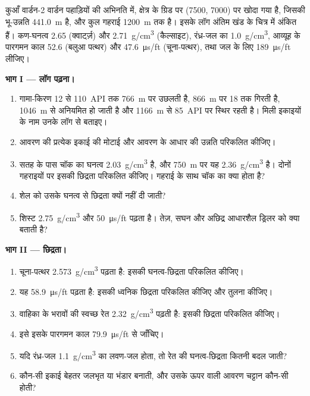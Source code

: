 \begin{problem}[{सप्ताहांत समस्या --- एक काल्पनिक कुएँ के लॉग, छिद्रता, संलक्षणी और शुद्ध रेत,
वार्डन अभिनति में}]
\label{pb:b3:facies-models:1}
कुआँ वार्डन-2 वार्डन पहाड़ियों की अभिनति में, क्षेत्र के ग्रिड पर (7500, 7000) पर
खोदा गया है, जिसकी भू-उन्नति
\qty{441.0}{m} है, और कुल गहराई \qty{1200}{m} तक है। इसके लॉग अंतिम खंड के चित्र में अंकित हैं।
कण-घनत्व 2.65 (क्वार्ट्ज़) और
\qty{2.71}{g/cm^3} (कैल्साइट), रंध्र-जल का \qty{1.0}{g/cm^3}, आव्यूह के
पारगमन काल 52.6 (बलुआ पत्थर) और \qty{47.6}{\micro\second/ft}
(चूना-पत्थर), तथा जल के लिए \qty{189}{\micro\second/ft} लीजिए।

\medskip\noindent\textbf{भाग I --- लॉग पढ़ना।}
\begin{enumerate}
\item गामा-किरण 12 से \qty{110}{API} तक \qty{766}{m} पर उछलती है,
  \qty{866}{m} पर 18 तक गिरती है, \qty{1046}{m} से अनियमित हो जाती है और
  \qty{1166}{m} से \qty{85}{API} पर स्थिर रहती है। मिली इकाइयों के नाम उनके लॉग से बताइए।
\item आवरण की प्रत्येक इकाई की मोटाई और
  आवरण के आधार की उन्नति परिकलित कीजिए।
\item सतह के पास चॉक का घनत्व \qty{2.03}{g/cm^3} है, और
  \qty{750}{m} पर यह \qty{2.36}{g/cm^3} है। दोनों गहराइयों पर इसकी छिद्रता परिकलित कीजिए।
  गहराई के साथ चॉक का क्या होता है?
\item शेल को उसके घनत्व से छिद्रता क्यों नहीं दी जाती?
\item शिस्ट \qty{2.75}{g/cm^3} और \qty{50}{\micro\second/ft} पढ़ता है।
  तेज़, सघन और अछिद्र आधारशैल ड्रिलर को क्या बताती है?
\end{enumerate}

\medskip\noindent\textbf{भाग II --- छिद्रता।}
\begin{enumerate}[resume]
\item चूना-पत्थर \qty{2.573}{g/cm^3} पढ़ता है: इसकी घनत्व-छिद्रता परिकलित कीजिए।
\item यह \qty{58.9}{\micro\second/ft} पढ़ता है: इसकी ध्वनिक छिद्रता परिकलित कीजिए और
  तुलना कीजिए।
\item वाहिका के भरावों की स्वच्छ रेत \qty{2.32}{g/cm^3} पढ़ती है: इसकी
  छिद्रता परिकलित कीजिए।
\item इसे इसके पारगमन काल \qty{79.9}{\micro\second/ft} से जाँचिए।
\item यदि रंध्र-जल \qty{1.1}{g/cm^3} का लवण-जल होता, तो रेत की घनत्व-छिद्रता
  कितनी बदल जाती?
\item कौन-सी इकाई बेहतर जलभृत या भंडार बनाती, और
  उसके ऊपर वाली आवरण चट्टान कौन-सी होती?
\end{enumerate}


\end{problem}
